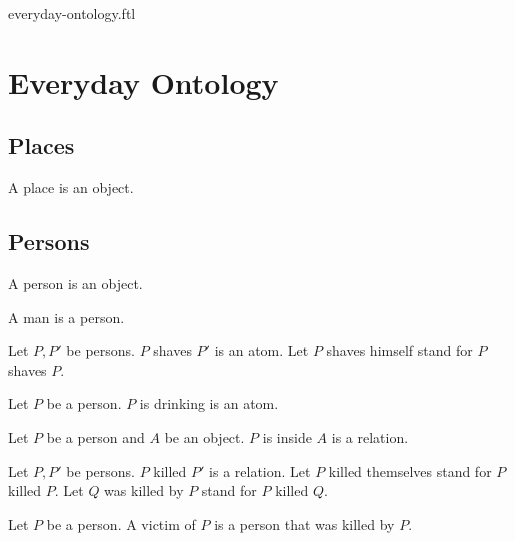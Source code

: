 \documentclass{naproche-library}
\begin{document}
\begin{smodule}{everyday-ontology.ftl}


\section{Everyday Ontology}

\subsection{Places}

\begin{signature*}[forthel]
  A place is an object.
\end{signature*}


\subsection{Persons}

\begin{signature*}[forthel]
  A person is an object.
\end{signature*}

\begin{signature*}[forthel]
  A man is a person.
\end{signature*}

\begin{signature*}[forthel]
  Let $P, P'$ be persons.
  $P$ shaves $P'$ is an atom.
  Let $P$ shaves himself stand for $P$ shaves $P$.
\end{signature*}

\begin{signature*}[forthel]
  Let $P$ be a person.
  $P$ is drinking is an atom.
\end{signature*}

\begin{signature*}[forthel]
  Let $P$ be a person and $A$ be an object.
  $P$ is inside $A$ is a relation.
\end{signature*}

\begin{signature*}[forthel]
  Let $P, P'$ be persons.
  $P$ killed $P'$ is a relation.
  Let $P$ killed themselves stand for $P$ killed $P$.
  Let $Q$ was killed by $P$ stand for $P$ killed $Q$.
\end{signature*}

\begin{definition*}[forthel]
  Let $P$ be a person.
  A victim of $P$ is a person that was killed by $P$.
\end{definition*}


\end{smodule}
\end{document}
